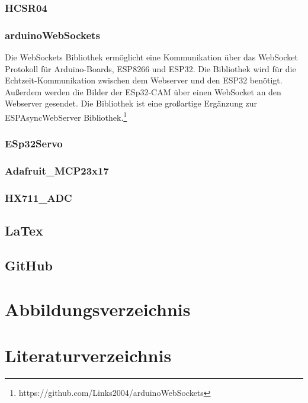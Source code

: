 \documentclass[ngerman,12pt,a4paper]{article}
\begin{document}
			\subsubsection*{HCSR04}
			
			\subsubsection*{arduinoWebSockets}
			
	Die WebSockets Bibliothek ermöglicht eine Kommunikation über das WebSocket Protokoll für Arduino-Boards, ESP8266 und ESP32. Die Bibliothek wird für die Echtzeit-Kommunikation zwischen dem Webserver und den ESP32 benötigt. Außerdem werden die Bilder der ESp32-CAM über einen WebSocket an den Webserver gesendet. Die Bibliothek ist eine großartige Ergänzung zur ESPAsyncWebServer Bibliothek.\footnote{https://github.com/Links2004/arduinoWebSockets}
			
			\subsubsection*{ESp32Servo}
			
			\subsubsection*{Adafruit\_MCP23x17}
			
			\subsubsection*{HX711\_ADC}
				
	 \subsection{LaTex}
	 
	 \subsection{GitHub}
	 
\newpage
	
	\section{Abbildungsverzeichnis}
	
		\listoffigures
\newpage
	\section{Literaturverzeichnis}
	 
\end{document}
